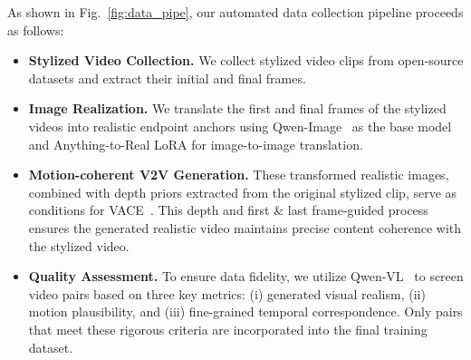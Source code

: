 \documentclass[runningheads]{llncs}
\begin{document}

As shown in Fig.~\ref{fig:data_pipe}, our automated data collection pipeline proceeds as follows:
\begin{itemize}
\item \noindent\textbf{Stylized Video Collection.} We collect stylized video clips from open-source datasets and extract their initial and final frames.
    \item \noindent\textbf{Image Realization.}
We translate the first and final frames of the stylized videos into realistic endpoint anchors using Qwen-Image~\cite{qwenimage} as the base model and Anything-to-Real LoRA for image-to-image translation. 
\item \noindent\textbf{Motion-coherent V2V Generation.} These transformed realistic images, combined with depth priors extracted from the original stylized clip, serve as conditions for VACE~\cite{jiang2025vace}. This depth and first \& last frame-guided process ensures the generated realistic video maintains precise content coherence with the stylized video.
\item \noindent\textbf{Quality Assessment.}
To ensure data fidelity, we utilize Qwen-VL~\cite{qwenvl} to screen video pairs based on three key metrics: (i) generated visual realism, (ii) motion plausibility, and (iii) fine-grained temporal correspondence. Only pairs that meet these rigorous criteria are incorporated into the final training dataset.
\end{itemize}
\end{document}
